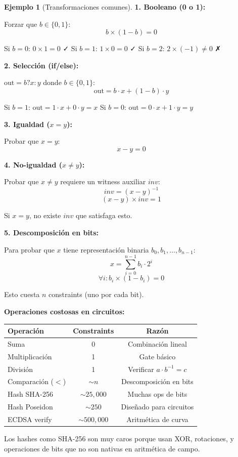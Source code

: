\documentclass[11pt,a4paper,twoside,openright]{book}
\theoremstyle{definition}
\newtheorem{example}{Ejemplo}[chapter]
\theoremstyle{plain}
\theoremstyle{remark}
\begin{document}
\begin{example}[Transformaciones comunes]
\textbf{1. Booleano (0 o 1):}

Forzar que $b \in \{0, 1\}$:
\[ b \times (1 - b) = 0 \]

Si $b = 0$: $0 \times 1 = 0$ ✓
Si $b = 1$: $1 \times 0 = 0$ ✓
Si $b = 2$: $2 \times (-1) \neq 0$ ✗

\textbf{2. Selección (if/else):}

$\text{out} = b ? x : y$ donde $b \in \{0, 1\}$:
\[ \text{out} = b \cdot x + (1 - b) \cdot y \]

Si $b = 1$: $\text{out} = 1 \cdot x + 0 \cdot y = x$
Si $b = 0$: $\text{out} = 0 \cdot x + 1 \cdot y = y$

\textbf{3. Igualdad ($x = y$):}

Probar que $x = y$:
\[ x - y = 0 \]

\textbf{4. No-igualdad ($x \neq y$):}

Probar que $x \neq y$ requiere un witness auxiliar $inv$:
\[ inv = (x - y)^{-1} \]
\[ (x - y) \times inv = 1 \]

Si $x = y$, no existe $inv$ que satisfaga esto.

\textbf{5. Descomposición en bits:}

Para probar que $x$ tiene representación binaria $b_0, b_1, \ldots, b_{n-1}$:
\[ x = \sum_{i=0}^{n-1} b_i \cdot 2^i \]
\[ \forall i: b_i \times (1 - b_i) = 0 \]

Esto cuesta $n$ constraints (uno por cada bit).
\end{example}

\begin{advertencia}
\textbf{Operaciones costosas en circuitos:}

\begin{center}
\begin{tabular}{lcc}
\toprule
\textbf{Operación} & \textbf{Constraints} & \textbf{Razón} \\
\midrule
Suma & 0 & Combinación lineal \\
Multiplicación & 1 & Gate básico \\
División & 1 & Verificar $a \cdot b^{-1} = c$ \\
Comparación ($<$) & $\sim n$ & Descomposición en bits \\
Hash SHA-256 & $\sim 25,000$ & Muchas ops de bits \\
Hash Poseidon & $\sim 250$ & Diseñado para circuitos \\
ECDSA verify & $\sim 500,000$ & Aritmética de curva \\
\bottomrule
\end{tabular}
\end{center}

Los hashes como SHA-256 son muy caros porque usan XOR, rotaciones, y operaciones de bits que no son nativas en aritmética de campo.
\end{advertencia}
\end{document}
